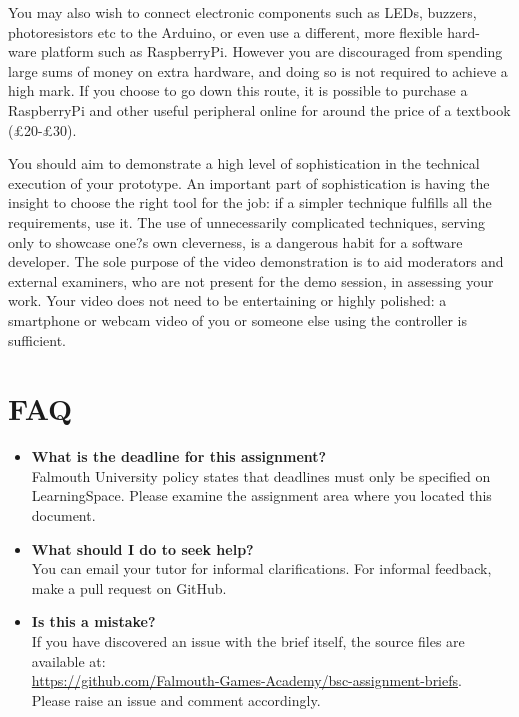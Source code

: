 \documentclass{../fal_assignment}
\begin{document}
You may also wish to connect electronic components such as LEDs, buzzers, photoresistors etc to the Arduino, or even use a different, more flexible hard- ware platform such as RaspberryPi. However you are discouraged from spending large sums of money on extra hardware, and doing so is not required to achieve a high mark. If you choose to go down this route, it is possible to purchase a RaspberryPi and other useful peripheral online for around the price of a textbook (\pounds20-\pounds30). 

You should aim to demonstrate a high level of sophistication in the technical execution of your prototype. An important part of sophistication is having the insight to choose the right tool for the job: if a simpler technique fulfills all the requirements, use it. The use of unnecessarily complicated techniques, serving only to showcase one?s own cleverness, is a dangerous habit for a software developer. 
The sole purpose of the video demonstration is to aid moderators and external examiners, who are not present for the demo session, in assessing your work. Your video does not need to be entertaining or highly polished: a smartphone or webcam video of you or someone else using the controller is sufficient. 

\section*{FAQ}

\begin{itemize}
	\item 	\textbf{What is the deadline for this assignment?} \\ 
    		Falmouth University policy states that deadlines must only be specified on LearningSpace. Please examine the assignment area where you located this document.
    		
	\item 	\textbf{What should I do to seek help?} \\ 
    		You can email your tutor for informal clarifications. For informal feedback, make a pull request on GitHub. 
    		
    	\item 	\textbf{Is this a mistake?} \\ 	
    		If you have discovered an issue with the brief itself, the source files are available at: \\
    		\url{https://github.com/Falmouth-Games-Academy/bsc-assignment-briefs}.\\
    		 Please raise an issue and comment accordingly.
\end{itemize}
\end{document}

